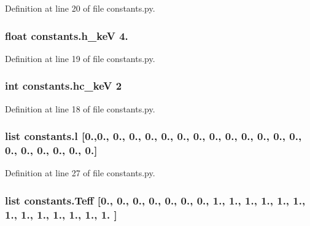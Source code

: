Definition at line 20 of file constants.\-py.

\hypertarget{namespaceconstants_a0efe5dbf3416b5b896e1105131013d28}{
\subsubsection[{h\-\_\-ke\-V}]{\setlength{\rightskip}{0pt plus 5cm}float constants.\-h\-\_\-ke\-V 4.}}\label{namespaceconstants_a0efe5dbf3416b5b896e1105131013d28}


Definition at line 19 of file constants.\-py.

\hypertarget{namespaceconstants_a8fc14c04ea3ffbe7eae735ef06d48159}{
\subsubsection[{hc\-\_\-ke\-V}]{\setlength{\rightskip}{0pt plus 5cm}int constants.\-hc\-\_\-ke\-V 2}}\label{namespaceconstants_a8fc14c04ea3ffbe7eae735ef06d48159}


Definition at line 18 of file constants.\-py.

\hypertarget{namespaceconstants_aee868a178cf4ca6c018337428f1ab0aa}{
\subsubsection[{l}]{\setlength{\rightskip}{0pt plus 5cm}list constants.\-l \mbox{[}0.,0., 0., 0., 0., 0., 0., 0., 0., 0., 0., 0., 0., 0., 0., 0., 0., 0., 0., 0.\mbox{]}}}\label{namespaceconstants_aee868a178cf4ca6c018337428f1ab0aa}


Definition at line 27 of file constants.\-py.

\hypertarget{namespaceconstants_ab0dc80c3bd717af623b46afcb757d81f}{
\subsubsection[{Teff}]{\setlength{\rightskip}{0pt plus 5cm}list constants.\-Teff \mbox{[}0., 0., 0., 0., 0., 0., 0., 1., 1., 1., 1., 1., 1., 1., 1., 1., 1., 1., 1., 1. \mbox{]}}}\label{namespaceconstants_ab0dc80c3bd717af623b46afcb757d81f}


